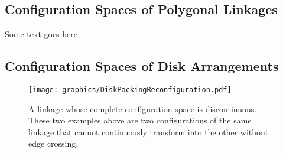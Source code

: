  \subsection{Configuration Spaces of Polygonal Linkages}
Some text goes here
 \subsection{Configuration Spaces of Disk Arrangements}


\begin{figure}[!h]
\begin{center}
\texttt{[image: graphics/DiskPackingReconfiguration.pdf]}
\end{center} 
\caption{A linkage whose complete configuration space is discontinuous.  These two examples above 
are two configurations of the same linkage that cannot continuously transform into the other 
without edge crossing.}
\label{fig:configuration-5}
\end{figure}













